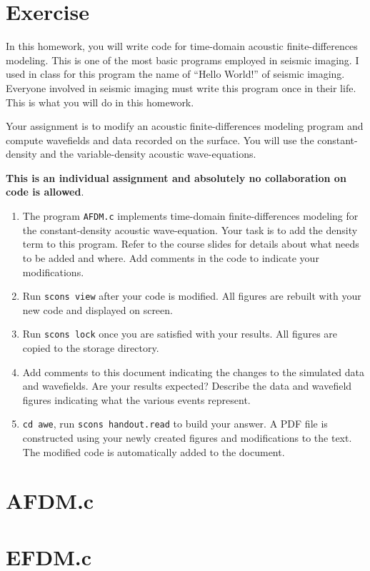 \newpage
\section{Exercise}
In this homework, you will write code for time-domain acoustic
finite-differences modeling. This is one of the most basic programs
employed in seismic imaging. I used in class for this program the name
of ``Hello World!'' of seismic imaging. Everyone involved in seismic
imaging must write this program once in their life. This is what you
will do in this homework.

Your assignment is to modify an acoustic finite-differences modeling
program and compute wavefields and data recorded on the surface. You
will use the constant-density and the variable-density acoustic
wave-equations.

\textbf{This is an individual assignment and absolutely no
  collaboration on code is allowed}.
\begin{enumerate}
\item The program \texttt{AFDM.c} implements time-domain
  finite-differences modeling for the constant-density acoustic
  wave-equation. Your task is to add the density term to this
  program. Refer to the course slides for details about what needs to
  be added and where. Add comments in the code to indicate your
  modifications.

\item Run \texttt{scons view} after your code is modified. All figures
  are rebuilt with your new code and displayed on screen.

\item Run \texttt{scons lock} once you are satisfied with your
  results. All figures are copied to the storage directory.

\item Add comments to this document indicating the changes to the
  simulated data and wavefields. Are your results expected? Describe
  the data and wavefield figures indicating what the various events
  represent.

\item \texttt{cd awe}, run \texttt{scons handout.read} to build your
  answer. A PDF file is constructed using your newly created figures
  and modifications to the text. The modified code is automatically
  added to the document.

\end{enumerate}

\newpage
\section{AFDM.c}
\tiny

\normalsize
\newpage
\section{EFDM.c}
\tiny

\normalsize


